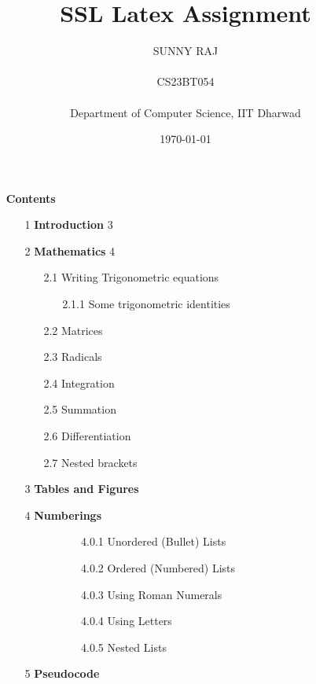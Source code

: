 \documentclass[12pt,a4paper]{article}
\title{SSL Latex Assignment}
\author{SUNNY RAJ \\ \\CS23BT054 \\ \\ Department of Computer Science, IIT Dharwad}
\date{\today}
\begin{document}
	\maketitle
	\pagebreak
	\begin{itemize}
		\item[] \textbf{Contents}
		\begin{enumerate}
			\item[1] \textbf{Introduction} \hfill{3}
			\item[2] \textbf{Mathematics} \hfill{4}
			\begin{enumerate}
				\item[2.1] Writing Trigonometric equations 
				\begin{enumerate}
					\item[2.1.1] Some trigonometric identities 
				\end{enumerate}
				\item[2.2] Matrices 
				\item[2.3] Radicals 
				\item[2.4] Integration 
				\item[2.5] Summation 
				\item[2.6] Differentiation 
				\item[2.7] Nested brackets 
			\end{enumerate}
			\item[3] \textbf{Tables and Figures} 
			\item[4] \textbf{Numberings} 
			\begin{itemize}
				\item[]
				\begin{itemize}
					\item[]
			\begin{enumerate}
						\item[4.0.1] Unordered (Bullet) Lists 
						\item[4.0.2] Ordered (Numbered) Lists 
						\item[4.0.3] Using Roman Numerals 
						\item[4.0.4] Using Letters 
						\item[4.0.5] Nested Lists 
			\end{enumerate}
			\end{itemize}
			\end{itemize}
			\item[5] \textbf{Pseudocode} 

\end{enumerate}
\end{itemize}
\end{document}
